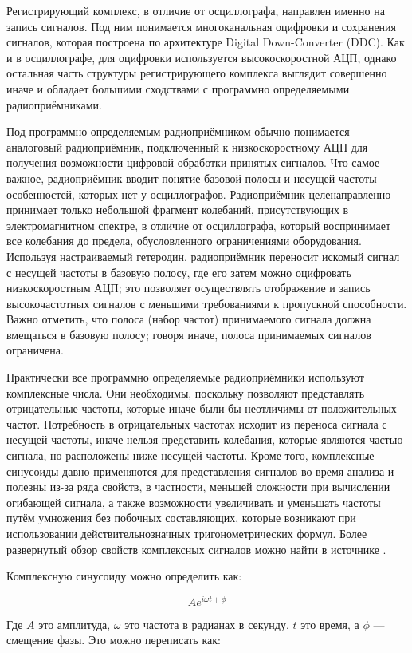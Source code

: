 \documentclass{report}
\begin{document}
Регистрирующий комплекс, в отличие от осциллографа, направлен именно на запись сигналов. Под ним понимается многоканальная оцифровки и сохранения сигналов, которая построена по архитектуре Digital Down-Converter (DDC). Как и в осциллографе, для оцифровки используется высокоскоростной АЦП, однако остальная часть структуры регистрирующего комплекса выглядит совершенно иначе и обладает большими сходствами с программно определяемыми радиоприёмниками.

Под программно определяемым радиоприёмником обычно понимается аналоговый радиоприёмник, подключенный к низкоскоростному АЦП для получения возможности цифровой обработки принятых сигналов. Что самое важное, радиоприёмник вводит понятие базовой полосы и несущей частоты --- особенностей, которых нет у осциллографов. Радиоприёмник целенаправленно принимает только небольшой фрагмент колебаний, присутствующих в электромагнитном спектре, в отличие от осциллографа, который воспринимает все колебания до предела, обусловленного ограничениями оборудования. Используя настраиваемый гетеродин, радиоприёмник переносит искомый сигнал с несущей частоты в базовую полосу, где его затем можно оцифровать низкоскоростным АЦП; это позволяет осуществлять отображение и запись высокочастотных сигналов с меньшими требованиями к пропускной способности. Важно отметить, что полоса (набор частот) принимаемого сигнала должна вмещаться в базовую полосу; говоря иначе, полоса принимаемых сигналов ограничена.

Практически все программно определяемые радиоприёмники используют комплексные числа. Они необходимы, поскольку позволяют представлять отрицательные частоты, которые иначе были бы неотличимы от положительных частот. Потребность в отрицательных частотах исходит из переноса сигнала с несущей частоты, иначе нельзя представить колебания, которые являются частью сигнала, но расположены ниже несущей частоты. Кроме того, комплексные синусоиды давно применяются для представления сигналов во время анализа и полезны из-за ряда свойств, в частности, меньшей сложности при вычислении огибающей сигнала, а также возможности увеличивать и уменьшать частоты путём умножения без побочных составляющих, которые возникают при использовании действительнозначных тригонометрических формул. Более развернутый обзор свойств комплексных сигналов можно найти в источнике \cite{iq_data}.

Комплексную синусоиду можно определить как:

$$
A e^{i \omega t + \phi}
$$

Где $A$ это амплитуда, $\omega$ это частота в радианах в секунду, $t$ это время, а $\phi$ --- смещение фазы. Это можно переписать как:
\end{document}
